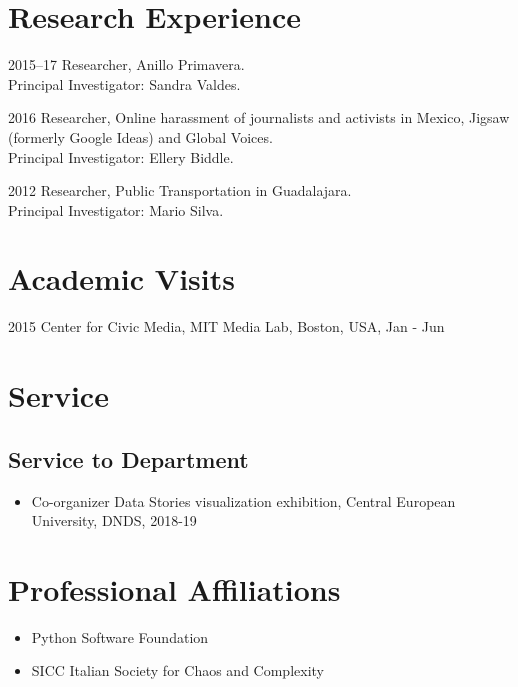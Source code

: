 \documentclass{academiccv}
\begin{document}
\section*{Research Experience}

\begin{tablist}
	
\item[2015--17] 	\tab Researcher, Anillo Primavera. \\
								Principal Investigator: Sandra Valdes.

\item[2016] 	\tab Researcher, Online harassment of journalists and activists in Mexico, Jigsaw (formerly Google Ideas) and Global Voices. \\
							Principal Investigator: Ellery Biddle.

\item[2012] \tab Researcher, Public Transportation in Guadalajara. \\
						Principal Investigator: Mario Silva.

\end{tablist}


\section*{Academic Visits}

\begin{tablist}
	
	\item[2015] 	\tab Center for Civic Media, MIT Media Lab, Boston, USA, Jan - Jun
		
\end{tablist}


\section*{Service}
\subsection*{Service to Department}
\begin{itemize}
	\item Co-organizer Data Stories visualization exhibition, Central European University, DNDS, 2018-19
\end{itemize}


\section*{Professional Affiliations}
\begin{itemize}
	\item Python Software Foundation
	\item SICC Italian Society for Chaos and Complexity
\end{itemize}
\end{document}
